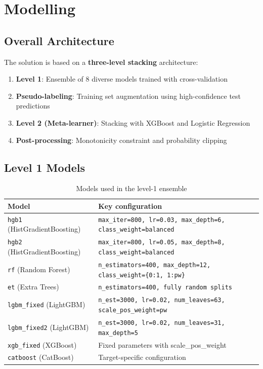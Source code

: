 \documentclass[12pt,a4paper]{article}
\begin{document}
\section{Modelling}

\subsection{Overall Architecture}

The solution is based on a \textbf{three-level stacking} architecture:

\begin{enumerate}
    \item \textbf{Level 1}: Ensemble of 8 diverse models trained with cross-validation
    \item \textbf{Pseudo-labeling}: Training set augmentation using high-confidence test predictions
    \item \textbf{Level 2 (Meta-learner)}: Stacking with XGBoost and Logistic Regression
    \item \textbf{Post-processing}: Monotonicity constraint and probability clipping
\end{enumerate}

\subsection{Level 1 Models}

\begin{table}[H]
\centering
\caption{Models used in the level-1 ensemble}
\renewcommand{\arraystretch}{1.3}
\begin{tabular}{lp{8cm}}
\toprule
\textbf{Model} & \textbf{Key configuration} \\
\midrule
\texttt{hgb1} (HistGradientBoosting) & \texttt{max\_iter=800, lr=0.03, max\_depth=6, class\_weight=balanced} \\
\texttt{hgb2} (HistGradientBoosting) & \texttt{max\_iter=800, lr=0.05, max\_depth=8, class\_weight=balanced} \\
\texttt{rf} (Random Forest) & \texttt{n\_estimators=400, max\_depth=12, class\_weight=\{0:1, 1:pw\}} \\
\texttt{et} (Extra Trees) & \texttt{n\_estimators=400, fully random splits} \\
\texttt{lgbm\_fixed} (LightGBM) & \texttt{n\_est=3000, lr=0.02, num\_leaves=63, scale\_pos\_weight=pw} \\
\texttt{lgbm\_fixed2} (LightGBM) & \texttt{n\_est=3000, lr=0.02, num\_leaves=31, max\_depth=5} \\
\texttt{xgb\_fixed} (XGBoost) & Fixed parameters with scale\_pos\_weight \\
\texttt{catboost} (CatBoost) & Target-specific configuration \\
\bottomrule
\end{tabular}
\end{table}
\end{document}
